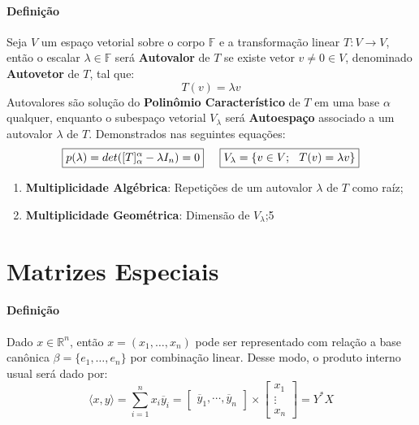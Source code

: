 \documentclass{article}
\begin{document}
        \paragraph{Definição}Seja $V$ um espaço vetorial sobre o corpo $\mathbb{F}$ e a transformação linear $T: V \rightarrow V$, então o escalar $\lambda \in \mathbb{F}$ será \textbf{Autovalor} de $T$ se existe vetor $v \neq 0 \in V$, denominado \textbf{Autovetor} de $T$, tal que:
            \[\boxed{T(v) = \lambda v}\]
        Autovalores são solução do \textbf{Polinômio Característico} de $T$ em uma base $\alpha$ qualquer, enquanto o subespaço vetorial $V_{\lambda}$ será \textbf{Autoespaço} associado a um autovalor $\lambda$ de $T$. Demonstrados nas seguintes equações:
            \[
                \boxed{p(\lambda) = det([T]_{\alpha}^{\alpha} - \lambda I_{n}) = 0}
                \hspace{5mm}
                \boxed{V_{\lambda} = \{ v\in V; \hspace{2.5mm} T(v) = \lambda v\}}
            \]
            \begin{enumerate}[noitemsep]
                \item \textbf{Multiplicidade Algébrica}: Repetições de um autovalor $\lambda$ de $T$ como raíz;
                \item \textbf{Multiplicidade Geométrica}: Dimensão de $V_{\lambda}$;5
            \end{enumerate}
\newpage

    \section{Matrizes Especiais}
        \paragraph{Definição}Dado $x\in\mathbb{R}^{n}$, então $x = (x_{1}, \dots, x_{n})$ pode ser representado com relação a base canônica $\beta = \{e_{1}, \dots, e_{n}\}$ por combinação linear. Desse modo, o produto interno usual será dado por:
            \[
                \boxed{
                    \langle x, y \rangle =
                    \sum_{i = 1}^{n} x_{i}\overline{y}_{i} =
                    \begin{bmatrix}\overline{y}_{1}, \cdots, \overline{y}_{n}\end{bmatrix} \times 
                    \begin{bmatrix} x_{1}\\ \vdots\\ x_{n}\end{bmatrix} = Y^{*}X
                }
            \]
\end{document}
